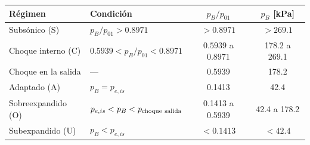 \begin{tabular}{llcc}
\toprule
R\'egimen & Condici\'on & $p_B/p_{01}$ & $p_B$ [kPa] \\
\midrule
Subs\'onico (S) & $p_B/p_{01} > 0.8971$ & $>0.8971$ & $>269.1$ \\
Choque interno (C) & $0.5939 < p_B/p_{01} < 0.8971$ & $0.5939$ a $0.8971$ & 178.2 a 269.1 \\
Choque en la salida & --- & 0.5939 & 178.2 \\
Adaptado (A) & $p_B=p_{e,is}$ & 0.1413 & 42.4 \\
Sobreexpandido (O) & $p_{e,is}<p_B<p_{\rm choque\ salida}$ & 0.1413 a 0.5939 & 42.4 a 178.2 \\
Subexpandido (U) & $p_B<p_{e,is}$ & $<0.1413$ & $<42.4$ \\
\bottomrule
\end{tabular}